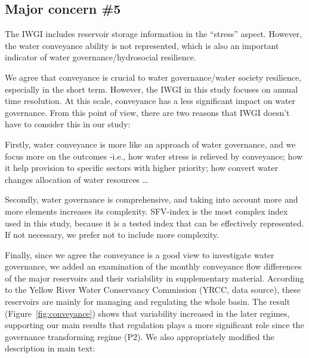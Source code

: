 \subsection{Major concern \#5}
\RC{} The IWGI includes reservoir storage information in the ``stress'' aspect. However, the water conveyance ability is not represented, which is also an important indicator of water governance/hydrosocial resilience.

\AR{} We agree that conveyance is crucial to water governance/water society resilience, especially in the short term. However, the IWGI in this study focuses on annual time resolution. At this scale, conveyance has a less significant impact on water governance. From this point of view, there are two reasons that IWGI doesn't have to consider this in our study:

\AR*{} Firstly, water conveyance is more like an approach of water governance, and we focus more on the outcomes -i.e., how water stress is relieved by conveyance; how it help provision to specific sectors with higher priority; how convert water changes allocation of water resources \dots

\AR*{} Secondly, water governance is comprehensive, and taking into account more and more elements increases its complexity. SFV-index is the most complex index used in this study, because it is a tested index that can be effectively represented. If not necessary, we prefer not to include more complexity.

\AR*{} Finally, since we agree the conveyance is a good view to investigate water governance, we added an examination of the monthly conveyance flow differences of the major reservoirs and their variability in supplementary material. According to the Yellow River Water Conservancy Commission (YRCC, data source), these reservoirs are mainly for managing and regulating the whole basin. The result (Figure~\ref{fig:conveyance}) shows that variability increased in the later regimes, supporting our main results that regulation plays a more significant role since the governance transforming regime (P2). We also appropriately modified the description in main text:

